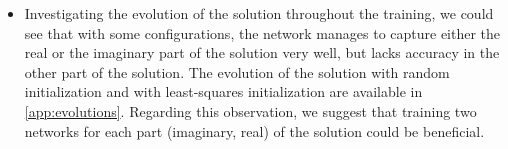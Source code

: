 \begin{itemize}
    \item Investigating the evolution of the solution throughout the training, we could see that with some configurations, the network manages to capture either the real or the imaginary part of the solution very well, but lacks accuracy in the other part of the solution. The evolution of the solution with random initialization and with least-squares initialization are available in \autoref{app:evolutions}. Regarding this observation, we suggest that training two networks for each part (imaginary, real) of the solution could be beneficial.

\end{itemize}
